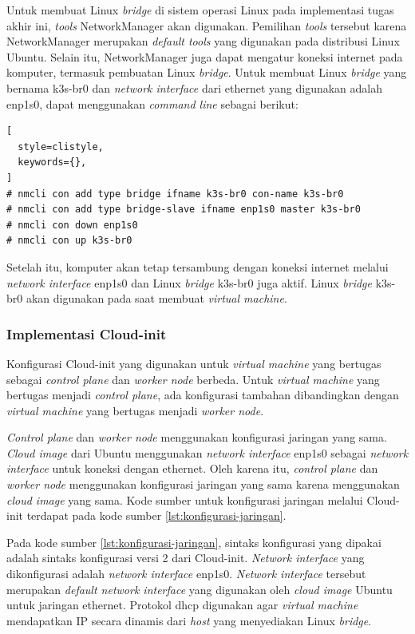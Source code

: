 Untuk membuat Linux \emph{bridge} di sistem operasi Linux pada implementasi tugas akhir ini,
\emph{tools} NetworkManager akan digunakan. Pemilihan \emph{tools} tersebut karena
NetworkManager merupakan \emph{default tools} yang digunakan pada distribusi Linux
Ubuntu. Selain itu, NetworkManager juga dapat mengatur koneksi internet pada
komputer, termasuk pembuatan Linux \emph{bridge}. Untuk membuat Linux \emph{bridge}
yang bernama k3s-br0 dan \emph{network interface} dari ethernet yang digunakan
adalah enp1s0, dapat menggunakan \emph{command line} sebagai berikut:

\begin{lstlisting}[
  style=clistyle,
  keywords={},
]
# nmcli con add type bridge ifname k3s-br0 con-name k3s-br0
# nmcli con add type bridge-slave ifname enp1s0 master k3s-br0
# nmcli con down enp1s0
# nmcli con up k3s-br0
\end{lstlisting}

Setelah itu, komputer akan tetap tersambung dengan koneksi internet melalui
\emph{network interface} enp1s0 dan Linux \emph{bridge} k3s-br0 juga aktif.
Linux \emph{bridge} k3s-br0 akan digunakan pada saat membuat \emph{virtual machine}.
\subsubsection{Implementasi Cloud-init}
\label{sec:implementasi-cloud-init}

Konfigurasi Cloud-init yang digunakan untuk \emph{virtual machine} yang bertugas sebagai \emph{control plane}
dan \emph{worker node} berbeda. Untuk \emph{virtual machine} yang bertugas menjadi \emph{control plane},
ada konfigurasi tambahan dibandingkan dengan \emph{virtual machine} yang bertugas menjadi \emph{worker node}.

\emph{Control plane} dan \emph{worker node} menggunakan konfigurasi jaringan yang sama. \emph{Cloud image}
dari Ubuntu menggunakan \emph{network interface} enp1s0 sebagai \emph{network interface} untuk
koneksi dengan ethernet. Oleh karena itu, \emph{control plane} dan \emph{worker node} menggunakan
konfigurasi jaringan yang sama karena menggunakan \emph{cloud image} yang sama. Kode sumber untuk
konfigurasi jaringan melalui Cloud-init terdapat pada kode sumber \ref{lst:konfigurasi-jaringan}.



Pada kode sumber \ref{lst:konfigurasi-jaringan}, sintaks konfigurasi yang dipakai adalah sintaks
konfigurasi versi 2 dari Cloud-init. \emph{Network interface} yang dikonfigurasi adalah \emph{network interface}
enp1s0. \emph{Network interface} tersebut merupakan \emph{default network interface} yang digunakan
oleh \emph{cloud image} Ubuntu untuk jaringan ethernet. Protokol dhcp digunakan agar \emph{virtual machine} mendapatkan
IP secara dinamis dari \emph{host} yang menyediakan Linux \emph{bridge}.

